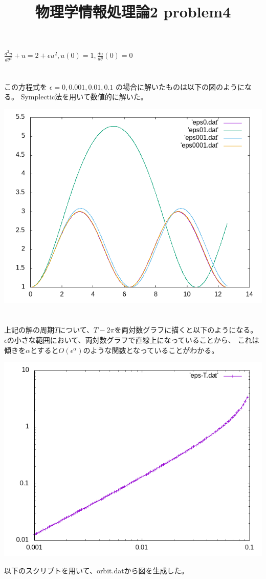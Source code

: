\documentclass[12pt,a5]{bxjsarticle}
\title{物理学情報処理論2 problem4}
\date{}
\begin{document}
\maketitle

$ \frac{d^2u}{d\theta^2} + u = 2 + \epsilon u^2, u(0) = 1, \frac{du}{d\theta}(0) = 0 $

\section{}
この方程式を $ \epsilon = 0, 0.001, 0.01, 0.1 $ の場合に解いたものは以下の図のようになる。
Symplectic法を用いて数値的に解いた。

\includegraphics[width=\linewidth]{orbit.png}

\section{}
上記の解の周期$ T $について、$ T - 2\pi $を両対数グラフに描くと以下のようになる。
$\epsilon$の小さな範囲において、両対数グラフで直線上になっていることから、
これは傾きを$ \alpha $とすると$ O(\epsilon^\alpha) $のような関数となっていることがわかる。

\includegraphics[width=\linewidth]{T.png}

以下のスクリプトを用いて、orbit.datから図を生成した。

\end{document}
